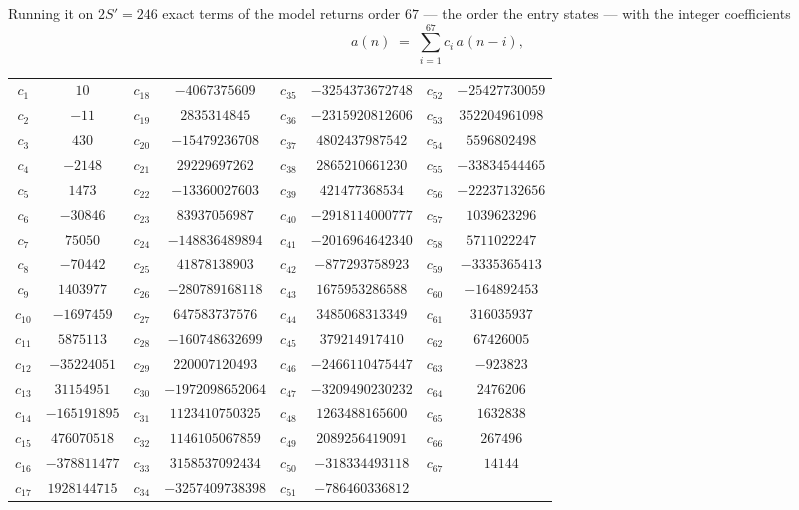 \documentclass[11pt,a4paper]{article}
\theoremstyle{plain}
\theoremstyle{definition}
\begin{document}
Running it on $2S'=246$ exact terms of the model returns order $67$ --- the order the
entry states --- with the integer coefficients
\[
a(n)\;=\;\sum_{i=1}^{67}c_i\,a(n-i),
\]
\begin{center}\small
\begin{tabular}{cccccccc}
$c_{1}$ & $10$ & $c_{18}$ & $-4067375609$ & $c_{35}$ & $-3254373672748$ & $c_{52}$ & $-25427730059$ \\
$c_{2}$ & $-11$ & $c_{19}$ & $2835314845$ & $c_{36}$ & $-2315920812606$ & $c_{53}$ & $352204961098$ \\
$c_{3}$ & $430$ & $c_{20}$ & $-15479236708$ & $c_{37}$ & $4802437987542$ & $c_{54}$ & $5596802498$ \\
$c_{4}$ & $-2148$ & $c_{21}$ & $29229697262$ & $c_{38}$ & $2865210661230$ & $c_{55}$ & $-33834544465$ \\
$c_{5}$ & $1473$ & $c_{22}$ & $-13360027603$ & $c_{39}$ & $421477368534$ & $c_{56}$ & $-22237132656$ \\
$c_{6}$ & $-30846$ & $c_{23}$ & $83937056987$ & $c_{40}$ & $-2918114000777$ & $c_{57}$ & $1039623296$ \\
$c_{7}$ & $75050$ & $c_{24}$ & $-148836489894$ & $c_{41}$ & $-2016964642340$ & $c_{58}$ & $5711022247$ \\
$c_{8}$ & $-70442$ & $c_{25}$ & $41878138903$ & $c_{42}$ & $-877293758923$ & $c_{59}$ & $-3335365413$ \\
$c_{9}$ & $1403977$ & $c_{26}$ & $-280789168118$ & $c_{43}$ & $1675953286588$ & $c_{60}$ & $-164892453$ \\
$c_{10}$ & $-1697459$ & $c_{27}$ & $647583737576$ & $c_{44}$ & $3485068313349$ & $c_{61}$ & $316035937$ \\
$c_{11}$ & $5875113$ & $c_{28}$ & $-160748632699$ & $c_{45}$ & $379214917410$ & $c_{62}$ & $67426005$ \\
$c_{12}$ & $-35224051$ & $c_{29}$ & $220007120493$ & $c_{46}$ & $-2466110475447$ & $c_{63}$ & $-923823$ \\
$c_{13}$ & $31154951$ & $c_{30}$ & $-1972098652064$ & $c_{47}$ & $-3209490230232$ & $c_{64}$ & $2476206$ \\
$c_{14}$ & $-165191895$ & $c_{31}$ & $1123410750325$ & $c_{48}$ & $1263488165600$ & $c_{65}$ & $1632838$ \\
$c_{15}$ & $476070518$ & $c_{32}$ & $1146105067859$ & $c_{49}$ & $2089256419091$ & $c_{66}$ & $267496$ \\
$c_{16}$ & $-378811477$ & $c_{33}$ & $3158537092434$ & $c_{50}$ & $-318334493118$ & $c_{67}$ & $14144$ \\
$c_{17}$ & $1928144715$ & $c_{34}$ & $-3257409738398$ & $c_{51}$ & $-786460336812$ &  &  \\
\end{tabular}
\end{center}
\end{document}
